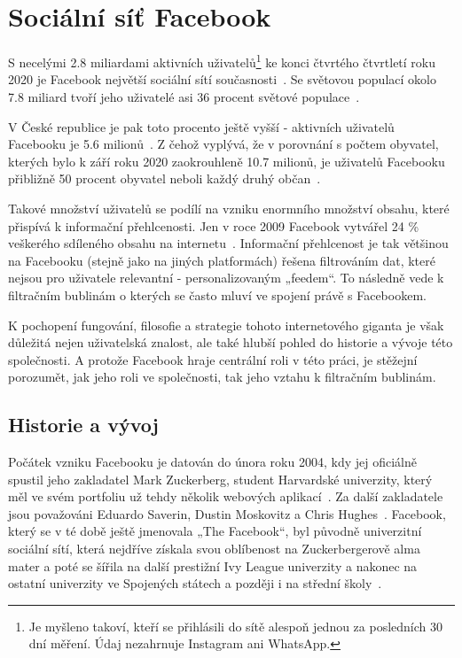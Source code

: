 
\chapter{Sociální síť Facebook}
\label{chapter:facebook}
    S necelými 2.8 miliardami aktivních uživatelů\footnote{Je myšleno takoví, kteří se přihlásili do sítě alespoň jednou za posledních 30 dní měření. Údaj nezahrnuje Instagram ani WhatsApp.} ke konci čtvrtého čtvrtletí roku 2020 je Facebook největší sociální sítí současnosti~\citep{tankovska_2021}. Se světovou populací okolo 7.8 miliard tvoří jeho uživatelé asi 36 procent světové populace~\citep{unitednations_2019}. 
    
    V České republice je pak toto procento ještě vyšší - aktivních uživatelů Facebooku je 5.6 milionů~\citep{tankovska_2021_a}. Z čehož vyplývá, že v porovnání s počtem obyvatel, kterých bylo k září roku 2020 zaokrouhleně 10.7 milionů, je uživatelů Facebooku přibližně 50 procent obyvatel neboli každý druhý občan~\citep{CSUobyvatele}. 
    
    Takové množství uživatelů se podílí na vzniku enormního množství obsahu, které přispívá k informační přehlcenosti. Jen v roce 2009 Facebook vytvářel 24 \% veškerého sdíleného obsahu na internetu~\citep{carlson_2009}. Informační přehlcenost je tak většinou na Facebooku (stejně jako na jiných platformách) řešena filtrováním dat, které nejsou pro uživatele relevantní - personalizovaným „feedem“. To následně vede k filtračním bublinám o kterých se často mluví ve spojení právě s Facebookem.~\citep{nagulendra2014understanding} 
    
    K pochopení fungování, filosofie a strategie tohoto internetového giganta je však důležitá nejen uživatelská znalost, ale také hlubší pohled do historie a vývoje této společnosti. A protože Facebook hraje centrální roli v této práci, je stěžejní porozumět, jak jeho roli ve společnosti, tak jeho vztahu k filtračním bublinám. 


\section{Historie a vývoj}
\label{sec:historie-vyvoj}
    Počátek vzniku Facebooku je datován do února roku 2004, kdy jej oficiálně spustil jeho zakladatel Mark Zuckerberg, student Harvardské univerzity, který měl ve svém portfoliu už tehdy několik webových aplikací~\citep{phillips_2007}. Za další zakladatele jsou považováni Eduardo Saverin, Dustin Moskovitz a Chris Hughes~\citep{Hall_2021}. Facebook, který se v té době ještě jmenovala „The Facebook“, byl původně univerzitní sociální sítí, která nejdříve získala svou oblíbenost na Zuckerbergerově alma mater a poté se šířila na další prestižní Ivy League univerzity a nakonec na ostatní univerzity ve Spojených státech a později i na střední školy~\citep{phillips_2007}. 
    
